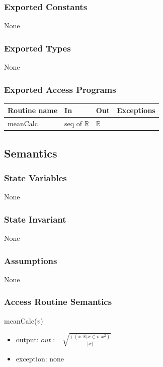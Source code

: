 \documentclass[12pt,fleqn]{examtst}
\begin{document}
\subsubsection* {Exported Constants}

None

\subsubsection* {Exported Types}

None 

\subsubsection* {Exported Access Programs}

\begin{tabular}{| l | l | l | p{5cm} |}
\hline
\textbf{Routine name} & \textbf{In} & \textbf{Out} & \textbf{Exceptions}\\
\hline
meanCalc & seq of $\mathbb{R}$ & $\mathbb{R}$ & ~\\
\hline
\end{tabular}

\subsection* {Semantics}

\subsubsection* {State Variables}

None

\subsubsection* {State Invariant}

None

\subsubsection* {Assumptions}

None

\subsubsection* {Access Routine Semantics}

meanCalc($v$)
\begin{itemize}
\item output: $\mathit{out} := \sqrt{\frac{+(x: \mathbb{R} | x \in v : x^2)}{|x|}}$
\item exception: none
\end{itemize}
\end{document}
